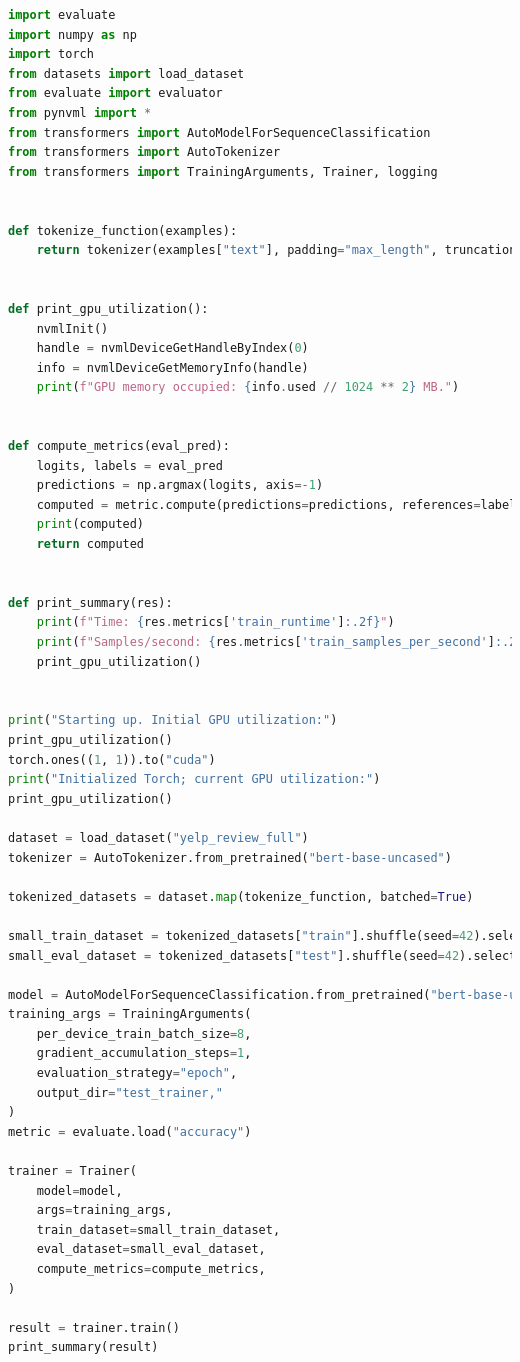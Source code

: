 \documentclass[a4paper]{report}
\begin{document}
\begin{lstlisting}[language=python]
import evaluate
import numpy as np
import torch
from datasets import load_dataset
from evaluate import evaluator
from pynvml import *
from transformers import AutoModelForSequenceClassification
from transformers import AutoTokenizer
from transformers import TrainingArguments, Trainer, logging


def tokenize_function(examples):
    return tokenizer(examples["text"], padding="max_length", truncation=True)


def print_gpu_utilization():
    nvmlInit()
    handle = nvmlDeviceGetHandleByIndex(0)
    info = nvmlDeviceGetMemoryInfo(handle)
    print(f"GPU memory occupied: {info.used // 1024 ** 2} MB.")


def compute_metrics(eval_pred):
    logits, labels = eval_pred
    predictions = np.argmax(logits, axis=-1)
    computed = metric.compute(predictions=predictions, references=labels)
    print(computed)
    return computed


def print_summary(res):
    print(f"Time: {res.metrics['train_runtime']:.2f}")
    print(f"Samples/second: {res.metrics['train_samples_per_second']:.2f}")
    print_gpu_utilization()


print("Starting up. Initial GPU utilization:")
print_gpu_utilization()
torch.ones((1, 1)).to("cuda")
print("Initialized Torch; current GPU utilization:")
print_gpu_utilization()

dataset = load_dataset("yelp_review_full")
tokenizer = AutoTokenizer.from_pretrained("bert-base-uncased")

tokenized_datasets = dataset.map(tokenize_function, batched=True)

small_train_dataset = tokenized_datasets["train"].shuffle(seed=42).select(range(1000))
small_eval_dataset = tokenized_datasets["test"].shuffle(seed=42).select(range(1000))

model = AutoModelForSequenceClassification.from_pretrained("bert-base-uncased", num_labels=5)
training_args = TrainingArguments(
    per_device_train_batch_size=8,
    gradient_accumulation_steps=1,
    evaluation_strategy="epoch",
    output_dir="test_trainer,"
)
metric = evaluate.load("accuracy")

trainer = Trainer(
    model=model,
    args=training_args,
    train_dataset=small_train_dataset,
    eval_dataset=small_eval_dataset,
    compute_metrics=compute_metrics,
)

result = trainer.train()
print_summary(result)
\end{lstlisting}
\end{document}
